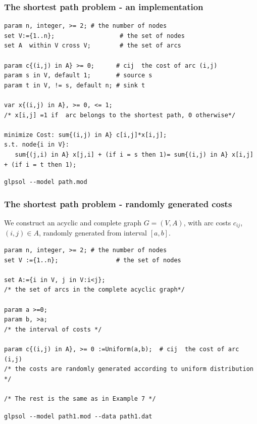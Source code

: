\documentclass[landscape]{beamer}
\begin{document}
\begin{frame}[fragile]
  \frametitle{The shortest path problem - an implementation}   
\begin{tiny}
\begin{verbatim}
param n, integer, >= 2; # the number of nodes 
set V:={1..n};                  # the set of nodes 
set A  within V cross V;        # the set of arcs 

param c{(i,j) in A} >= 0;      # cij  the cost of arc (i,j) 
param s in V, default 1;       # source s  
param t in V, != s, default n; # sink t 

var x{(i,j) in A}, >= 0, <= 1;
/* x[i,j] =1 if  arc belongs to the shortest path, 0 otherwise*/

minimize Cost: sum{(i,j) in A} c[i,j]*x[i,j];
s.t. node{i in V}:
   sum{(j,i) in A} x[j,i] + (if i = s then 1)= sum{(i,j) in A} x[i,j] + (if i = t then 1);
\end{verbatim}
\end{tiny}
\begin{small}
\verb=glpsol --model path.mod=
\end{small}
\end{frame}

\begin{frame}[fragile]
  \frametitle{The shortest path problem - randomly generated costs}  
\begin{footnotesize} 
 We construct
 an acyclic and complete graph $G=(V,A)$, 
 with arc costs $c_{ij}$, $(i,j) \in A$,  randomly generated from interval $[a,b]$.  
\begin{tiny}
\begin{verbatim}
param n, integer, >= 2; # the number of nodes 
set V :={1..n};                # the set of nodes 

set A:={i in V, j in V:i<j};
/* the set of arcs in the complete acyclic graph*/

param a >=0;
param b, >a;
/* the interval of costs */

param c{(i,j) in A}, >= 0 :=Uniform(a,b);  # cij  the cost of arc (i,j) 
/* the costs are randomly generated according to uniform distribution */

/* The rest is the same as in Example 7 */
\end{verbatim}
\end{tiny}
\verb=glpsol --model path1.mod --data path1.dat=
\end{footnotesize}
\end{frame}
\end{document}
